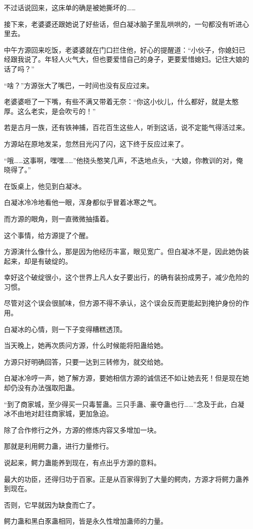 \begin{this_body}
不过话说回来，这床单的确是被她撕坏的……

接下来，老婆婆还跟她说了好些话，但白凝冰脑子里乱哄哄的，一句都没有听进心里去。

中午方源回来吃饭，老婆婆就在门口拦住他，好心的提醒道：“小伙子，你媳妇已经跟我说了。年轻人火气大，但也要爱惜自己的身子，更要爱惜媳妇。记住大娘的话了吗？”

“啥？”方源张大了嘴巴，一时间也没有反应过来。

老婆婆咂了一下嘴，有些不满又带着无奈：“你这小伙儿，什么都好，就是太憨厚。这么老实，是会吹亏的！”

若是古月一族，还有铁神捕，百花百生这些人，听到这话，说不定能气得活过来。

方源站在原地发呆，忽然目光闪了闪，这下终于反应过来了。

“哦……这事啊，嘿嘿……”他挠头憨笑几声，不迭地点头，“大娘，你教训的对，俺晓得了。”

在饭桌上，他见到白凝冰。

白凝冰冷冷地看他一眼，浑身都似乎冒着冰寒之气。

而方源的眼角，则一直微微抽搐着。

这个事情，给方源提了个醒。

方源演什么像什么，那是因为他经历丰富，眼见宽广。但白凝冰不是，因此她伪装起来，却是有破绽的。

幸好这个破绽很小，这个世界上凡人女子要出行，的确有装扮成男子，减少危险的习惯。

尽管对这个误会很腻味，但方源不得不承认，这个误会反而更能起到掩护身份的作用。

白凝冰的心情，则一下子变得糟糕透顶。

当天晚上，她再次质问方源，什么时候能将阳蛊给她。

方源只好明确回答，只要一达到三转修为，就交给她。

白凝冰冷哼一声，她了解方源，要她相信方源的诚信还不如让她去死！但是现在她却仍没有办法强取阳蛊。

“到了商家城，至少得买一只毒誓蛊。三只手蛊、豪夺蛊也行……”念及于此，白凝冰不由地对赶往商家城，更加急迫。

除了合作修行之外，方源的修炼内容又多增加一块。

那就是利用鳄力蛊，进行力量修行。

说起来，鳄力蛊能养到现在，有点出乎方源的意料。

最大的功臣，还得归功于百家。正是从百家得到了大量的鳄肉，方源才将鳄力蛊养到现在。

否则，它早就因为缺食而亡了。

鳄力蛊和黑白豕蛊相同，皆是永久性增加蛊师的力量。


\end{this_body}
